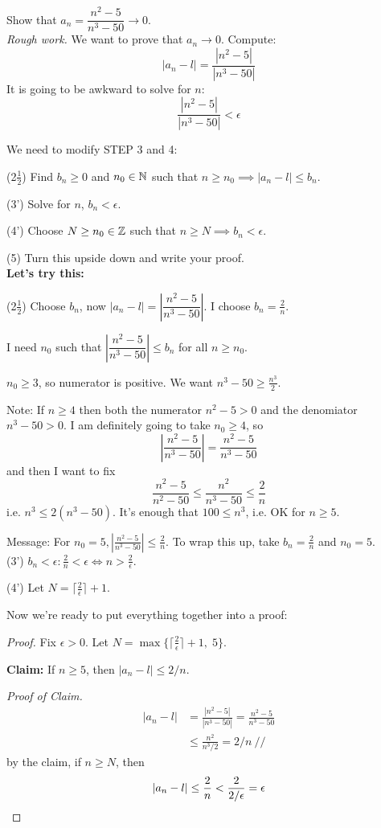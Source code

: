 \documentclass[10pt]{scrartcl}
\begin{document}
\begin{example} Show that $a_n = \dfrac{n^2 - 5}{n^3-50} \to 0$.\\
	
	
	\emph{Rough work.} We want to prove that $a_n \to 0$. Compute: 
	\[|a_n - l| = \frac{|n^2- 5|}{|n^3 - 50|}\]
	It is going to be awkward to solve for $n$: 
	\[\frac{|n^2- 5|}{|n^3 - 50|} < \epsilon\]
	

	We need to modify STEP 3 and 4: 
	
	(2$\frac{1}{2}$) Find $b_n \geq 0$ and $n_0 \in\mathbb{N}$ such that $n \geq n_0 \implies |a_n -l| \leq b_n$. 
	
	(3') Solve for $n$, $b_n < \epsilon$.
	
	(4') Choose $N \geq n_0 \in \mathbb{Z}$ such that $n \geq N \implies b_n <\epsilon$. 
	
	(5) Turn this upside down and write your proof.\\
	
	\textbf{Let's try this:}
	
	(2$\frac{1}{2}$) Choose $b_n$, now $|a_n -l| = \left|\dfrac{n^2-5}{n^3-50}\right|$. I choose $b_n = \frac{2}{n}$.
	
	 I need $n_0$ such that $ \left|\dfrac{n^2-5}{n^3-50}\right| \leq b_n$ for all $n \geq n_0$. 
	
	$n_0 \geq 3$, so numerator is positive. We want $n^3 - 50 \geq \frac{n^3}{2}$. 
	
	Note: If $n \geq 4$ then both the numerator $n^2 -5 >0$ and the denomiator $n^3 - 50 > 0$. I am definitely going to take $n_0 \geq 4$, so 
	\[\left|\frac{n^2-5}{n^3-50}\right| = \frac{n^2-5}{n^3-50}\]
	and then I want to fix 
	\[\frac{n^2-5}{n^2-50}\leq \frac{n^2}{n^3-50}\leq \frac{2}{n}\]
	i.e. $n^3 \leq 2(n^3-50)$. It's enough that $100 \leq n^3$, i.e. OK for $n \geq 5$. 
	
	Message: For $n_0 = 5, \left|\frac{n^2-5}{n^3-50}\right| \leq \frac{2}{n}$. To wrap this up, take $b_n = \frac{2}{n}$ and $n_0 = 5$.\\
	
	(3') $b_n < \epsilon: \frac{2}{n} < \epsilon \iff n >\frac{2}{\epsilon}$. 
	
	(4') Let $N = \lceil \frac{2}{\epsilon}\rceil + 1$.	
	
	Now we're ready to put everything together into a proof: 
	
	\begin{proof} Fix $\epsilon > 0$. Let $N = \max\{\lceil \frac{2}{\epsilon} \rceil + 1,\;5\}$.
	
	\textbf{Claim:} If $n \geq 5$, then $|a_n - l| \leq 2/n$.
	
	\textit{Proof of Claim.}
	\[
	\begin{aligned}
|a_n - l| &= \frac{|n^2-5|}{|n^3-50|} = \frac{n^2 - 5}{n^3-50} \\
& \leq \frac{n^2}{n^3/2} = 2/n ~//	
\end{aligned}
\]	
by the claim, if $n \geq N$, then 
\[|a_n - l| \leq \frac{2}{n} < \frac{2}{2/\epsilon} = \epsilon \qedhere\]
\end{proof}
\end{example} 
  
\theend 
\end{document}
